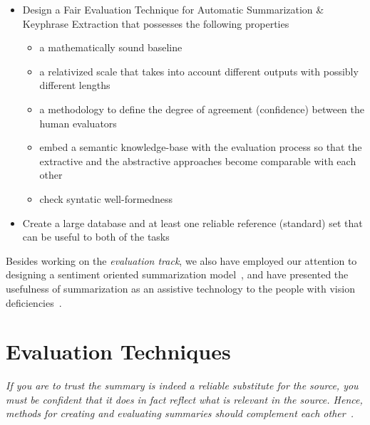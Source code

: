 \documentclass[a4paper]{report}
\begin{document}
\begin{itemize}
\item Design a Fair Evaluation Technique for Automatic Summarization \& Keyphrase Extraction that possesses the following properties
\begin{itemize}  
\item a mathematically sound baseline
\item a relativized scale that takes into account different outputs with possibly different lengths
\item a methodology to define the degree of agreement (confidence) between the human evaluators
\item embed a semantic knowledge-base with the evaluation process so that the extractive and the abstractive approaches become comparable with each other
\item check syntatic well-formedness
\end{itemize} 
\item Create a large database and at least one reliable reference (standard) set that can be useful to both of the tasks
\end{itemize}
Besides working on the \emph{evaluation track}, we also have employed our attention to designing a sentiment oriented summarization model~\cite{DBLP:conf/cicling/HamidT15}, and have presented the usefulness of summarization as an assistive technology to the people with vision deficiencies~\cite{DBLP:conf/petra/HamidT14}. 

\chapter{Evaluation Techniques}
\label{eval}

\emph{If you are to trust the summary is indeed a reliable substitute for the source, you must be confident that it does in fact reflect what is relevant in the source. Hence, methods for creating and evaluating summaries should complement each other~\cite{Hahn:2000:CAS:619057.621587}.}
\end{document}
